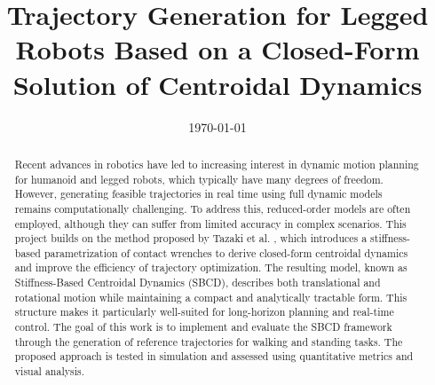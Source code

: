 \documentclass[12pt,a4paper,oneside]{article}
\title{Trajectory Generation for Legged Robots Based on a  Closed-Form Solution of Centroidal Dynamics}	                                    %
\date{\today}									    %
\theoremstyle{definition}
\theoremstyle{remark} %
\begin{document}

\newpage
\tableofcontents
\newpage
\begin{abstract}
\begin{sloppypar}
\noindent
Recent advances in robotics have led to increasing interest in dynamic motion planning for humanoid and legged robots, which typically have many degrees of freedom. However, generating feasible trajectories in real time using full dynamic models remains computationally challenging. To address this, reduced-order models are often employed, although they can suffer from limited accuracy in complex scenarios. This project builds on the method proposed by Tazaki et al. \cite{tazaki2024trajectory}, which introduces a stiffness-based parametrization of contact wrenches to derive closed-form centroidal dynamics and improve the efficiency of trajectory optimization. The resulting model, known as Stiffness-Based Centroidal Dynamics (SBCD), describes both translational and rotational motion while maintaining a compact and analytically tractable form. This structure makes it particularly well-suited for long-horizon planning and real-time control. The goal of this work is to implement and evaluate the SBCD framework through the generation of reference trajectories for walking and standing tasks. The proposed approach is tested in simulation and assessed using quantitative metrics and visual analysis.
\end{sloppypar}
\end{abstract}
\newpage

\clearpage

\clearpage

\clearpage

\clearpage

\clearpage

\clearpage

\clearpage



\end{document}
